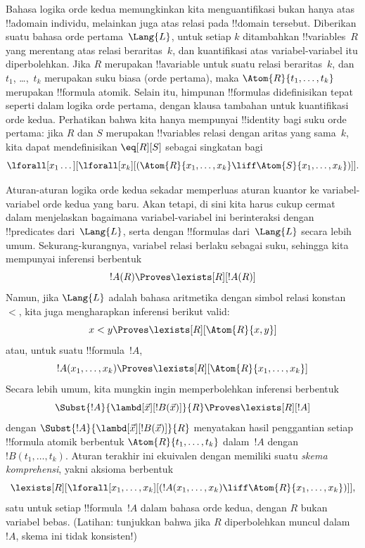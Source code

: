 \documentclass[../../../include/open-logic-section]{subfiles}
\begin{document}


Bahasa logika orde kedua memungkinkan kita menguantifikasi bukan hanya atas
!!a{domain} individu, melainkan juga atas relasi pada !!{domain} tersebut.
Diberikan suatu bahasa orde pertama~$\Lang{L}$, untuk setiap $k$ ditambahkan
!!{variable}s~$R$ yang merentang atas relasi beraritas~$k$, dan kuantifikasi atas
variabel-variabel itu diperbolehkan. Jika $R$ merupakan !!a{variable} untuk
suatu relasi beraritas~$k$, dan $t_1$, \dots,~$t_k$ merupakan suku biasa (orde
pertama), maka $\Atom{R}{t_1,\dots,t_k}$ merupakan !!{formula} atomik.
Selain itu, himpunan !!{formula}s didefinisikan tepat seperti dalam logika
orde pertama, dengan klausa tambahan untuk kuantifikasi orde kedua. Perhatikan
bahwa kita hanya mempunyai !!{identity} bagi suku orde pertama: jika $R$ dan
$S$ merupakan !!{variable}s relasi dengan aritas yang sama~$k$, kita dapat
mendefinisikan $\eq[R][S]$ sebagai singkatan bagi
\[
\lforall[x_1 \dots][\lforall[x_k][(\Atom{R}{x_1, \dots, x_k} \liff
  \Atom{S}{x_1, \dots, x_k})]].
\]

Aturan-aturan logika orde kedua sekadar memperluas aturan kuantor ke
variabel-variabel orde kedua yang baru. Akan tetapi, di sini kita harus cukup
cermat dalam menjelaskan bagaimana variabel-variabel ini berinteraksi dengan
!!{predicate}s dari~$\Lang{L}$, serta dengan !!{formula}s dari~$\Lang{L}$
secara lebih umum. Sekurang-kurangnya, variabel relasi berlaku sebagai suku,
sehingga kita mempunyai inferensi berbentuk
\[
!A(R) \Proves \lexists[R][!A(R)]
\]
Namun, jika $\Lang{L}$ adalah bahasa aritmetika dengan simbol relasi
konstan~$<$, kita juga mengharapkan inferensi berikut valid:
\[
x < y \Proves \lexists[R][\Atom{R}{x,y}]
\]
atau, untuk suatu !!{formula}~$!A$,
\[
!A(x_1, \dots, x_k) \Proves \lexists[R][\Atom{R}{x_1,\dots,x_k}]
\]
Secara lebih umum, kita mungkin ingin memperbolehkan inferensi berbentuk
\[
\Subst{!A}{\lambd[\vec x][!B(\vec x)]}{R} \Proves
\lexists[R][!A]
\]
dengan $\Subst{!A}{\lambd[\vec x][!B(\vec x)]}{R}$ menyatakan hasil
penggantian setiap !!{formula} atomik berbentuk
$\Atom{R}{t_1,\dots,t_k}$ dalam~$!A$ dengan $!B(t_1, \dots, t_k)$. Aturan
terakhir ini ekuivalen dengan memiliki suatu {\em skema komprehensi}, yakni
aksioma berbentuk
\[
\lexists[R][\lforall[x_1, \dots, x_k][(!A(x_1, \dots, x_k) \liff
\Atom{R}{x_1, \dots, x_k})]],
\]
satu untuk setiap !!{formula}~$!A$ dalam bahasa orde kedua, dengan $R$ bukan
variabel bebas. (Latihan: tunjukkan bahwa jika $R$ diperbolehkan muncul
dalam~$!A$, skema ini tidak konsisten!)
\end{document}
